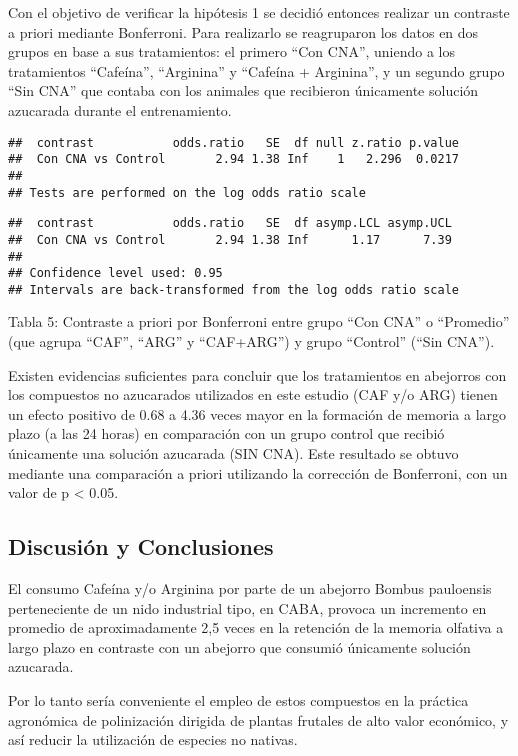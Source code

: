 \documentclass[
  11pt,
]{article}
\begin{document}
Con el objetivo de verificar la hipótesis 1 se decidió entonces realizar
un contraste a priori mediante Bonferroni. Para realizarlo se
reagruparon los datos en dos grupos en base a sus tratamientos: el
primero ``Con CNA'', uniendo a los tratamientos ``Cafeína'',
``Arginina'' y ``Cafeína + Arginina'', y un segundo grupo ``Sin CNA''
que contaba con los animales que recibieron únicamente solución
azucarada durante el entrenamiento.

\begin{verbatim}
##  contrast           odds.ratio   SE  df null z.ratio p.value
##  Con CNA vs Control       2.94 1.38 Inf    1   2.296  0.0217
## 
## Tests are performed on the log odds ratio scale
\end{verbatim}

\begin{verbatim}
##  contrast           odds.ratio   SE  df asymp.LCL asymp.UCL
##  Con CNA vs Control       2.94 1.38 Inf      1.17      7.39
## 
## Confidence level used: 0.95 
## Intervals are back-transformed from the log odds ratio scale
\end{verbatim}

Tabla 5: Contraste a priori por Bonferroni entre grupo ``Con CNA'' o
``Promedio'' (que agrupa ``CAF'', ``ARG'' y ``CAF+ARG'') y grupo
``Control'' (``Sin CNA'').

Existen evidencias suficientes para concluir que los tratamientos en
abejorros con los compuestos no azucarados utilizados en este estudio
(CAF y/o ARG) tienen un efecto positivo de 0.68 a 4.36 veces mayor en la
formación de memoria a largo plazo (a las 24 horas) en comparación con
un grupo control que recibió únicamente una solución azucarada (SIN
CNA). Este resultado se obtuvo mediante una comparación a priori
utilizando la corrección de Bonferroni, con un valor de p \textless{}
0.05.

\subsection{Discusión y Conclusiones}\label{discusiuxf3n-y-conclusiones}

El consumo Cafeína y/o Arginina por parte de un abejorro Bombus
pauloensis perteneciente de un nido industrial tipo, en CABA, provoca un
incremento en promedio de aproximadamente 2,5 veces en la retención de
la memoria olfativa a largo plazo en contraste con un abejorro que
consumió únicamente solución azucarada.

Por lo tanto sería conveniente el empleo de estos compuestos en la
práctica agronómica de polinización dirigida de plantas frutales de alto
valor económico, y así reducir la utilización de especies no nativas.
\end{document}
